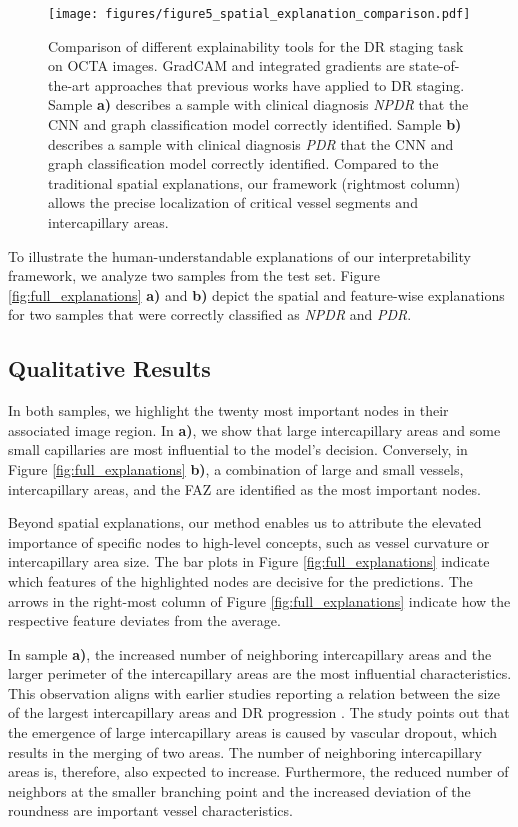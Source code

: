 \begin{figure*}[!t]
   \centering
    \texttt{[image: figures/figure5\_spatial\_explanation\_comparison.pdf]}
    \caption{Comparison of different explainability tools for the DR staging task on OCTA images. GradCAM and integrated gradients are state-of-the-art approaches that previous works have applied to DR staging. 
    Sample \textbf{a)} describes a sample with clinical diagnosis \textit{NPDR} that the CNN and graph classification model correctly identified. Sample \textbf{b)} describes a sample with clinical diagnosis \textit{PDR} that the CNN and graph classification model correctly identified. Compared to the traditional spatial explanations, our framework (rightmost column) allows the precise localization of critical vessel segments and intercapillary areas.}
    \label{fig:spatial_explanations}
\end{figure*}

To illustrate the human-understandable explanations of our interpretability framework, we analyze two samples from the test set. Figure \ref{fig:full_explanations} \textbf{a)} and \textbf{b)} depict the spatial and feature-wise explanations for two samples that were correctly classified as \textit{NPDR} and \textit{PDR}.

\subsection{Qualitative Results}

In both samples, we highlight the twenty most important nodes in their associated image region. 
In \textbf{a)}, we show that large intercapillary areas and some small capillaries are most influential to the model's decision. Conversely, in Figure \ref{fig:full_explanations} \textbf{b)}, a combination of large and small vessels, intercapillary areas, and the FAZ are identified as the most important nodes. 



Beyond spatial explanations, our method enables us to attribute the elevated importance of specific nodes to high-level concepts, such as vessel curvature or intercapillary area size. 
The bar plots in Figure \ref{fig:full_explanations} indicate which features of the highlighted nodes are decisive for the predictions. The arrows in the right-most column of Figure \ref{fig:full_explanations} indicate how the respective feature deviates from the average.

In sample \textbf{a)}, the increased number of neighboring intercapillary areas and the larger perimeter of the intercapillary areas are the most influential characteristics. This observation aligns with earlier studies reporting a relation between the size of the largest intercapillary areas and DR progression \cite{schottenhamml2016automatic}. The study points out that the emergence of large intercapillary areas is caused by vascular dropout, which results in the merging of two areas. The number of neighboring intercapillary areas is, therefore, also expected to increase. Furthermore, the reduced number of neighbors at the smaller branching point and the increased deviation of the roundness are important vessel characteristics. 

